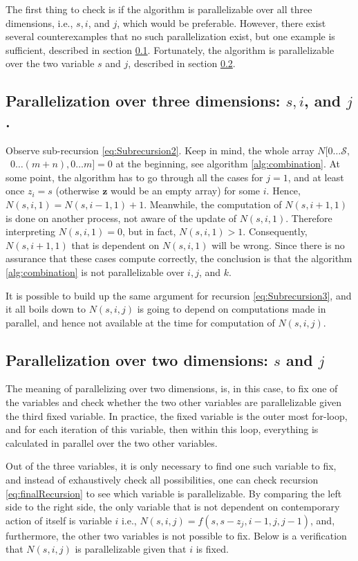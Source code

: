 \documentclass[a4paper,11pt]{article}
\begin{document}
The first thing to check is if the algorithm is parallelizable over all three dimensions, i.e., $s, i$, and $j$, which would be preferable. However, there exist several counterexamples that no such parallelization exist, but one example is sufficient, described in section \ref{sec:3Dpara}. Fortunately, the algorithm is parallelizable over the two variable $s$ and $j$, described in section \ref{sec:2Dpara}.

\subsection{Parallelization over three dimensions: $s, i$, and $j$.}
\label{sec:3Dpara}
Observe sub-recursion \ref{eq:Subrecursion2}. Keep in mind, the whole array $N[0\ldots \mathcal{S},$\ $0\ldots(m+n),0\ldots m]=0$ at the beginning, see algorithm \ref{alg:combination}.  At some point, the algorithm has to go through all the cases for $j=1$, and at least once $z_{i}=s$ (otherwise $\bm{z}$ would be an empty array) for some $i$. Hence, $N(s,i,1) = N(s,i-1,1)+1$. Meanwhile, the computation of $N(s,i+1,1)$ is done on another process, not aware of the update of $N(s,i,1)$. Therefore interpreting $N(s,i,1)=0$, but in fact, $N(s,i,1)>1$. Consequently, $N(s,i+1,1)$ that is dependent on $N(s,i,1)$ will be wrong. Since there is no assurance that these cases compute correctly, the conclusion is that the algorithm \ref{alg:combination} is not parallelizable over $i,j$, and $k$.

It is possible to build up the same argument for recursion \ref{eq:Subrecursion3}, and it all boils down to $N(s,i,j)$ is going to depend on computations made in parallel, and hence not available at the time for computation of $N(s,i,j)$.

\subsection{Parallelization over two dimensions: $s$ and $j$}
\label{sec:2Dpara}
The meaning of parallelizing over two dimensions, is, in this case, to fix one of the variables and check whether the two other variables are parallelizable given the third fixed variable. In practice, the fixed variable is the outer most for-loop, and for each iteration of this variable, then within this loop, everything is calculated in parallel over the two other variables.

Out of the three variables, it is only necessary to find one such variable to fix, and instead of exhaustively check all possibilities, one can check recursion \ref{eq:finalRecursion} to see which variable is parallelizable. By comparing the left side to the right side, the only variable that is not dependent on contemporary action of itself is variable $i$ i.e., $N(s,i,j)=f(s,s-z_{j},i-1,j,j-1)$, and, furthermore, the other two variables is not possible to fix. Below is a verification that $N(s,i,j)$ is parallelizable given that $i$ is fixed.
\end{document}
